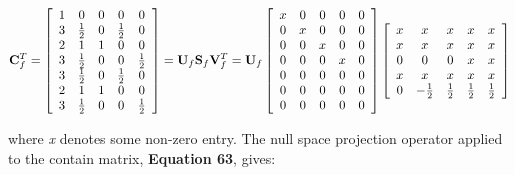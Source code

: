 \documentclass[11pt, titlepage, twoside]{article}
\begin{document}
\begin{MPEquation}[!ht]
\begin{equation}
{\bf{C}}_f^T = \left[ {\begin{array}{*{20}{c}}
1&0&0&0&0\\
3&{\frac{1}{2}}&0&{\frac{1}{2}}&0\\
2&1&1&0&0\\
3&{\frac{1}{2}}&0&0&{\frac{1}{2}}\\
3&{\frac{1}{2}}&0&{\frac{1}{2}}&0\\
2&1&1&0&0\\
3&{\frac{1}{2}}&0&0&{\frac{1}{2}}
\end{array}} \right] = {{\bf{U}}_f}{{\bf{S}}_f}{\bf{V}}_f^T = {{\bf{U}}_f}\left[ {\begin{array}{*{20}{c}}
x&0&0&0&0\\
0&x&0&0&0\\
0&0&x&0&0\\
0&0&0&x&0\\
0&0&0&0&0\\
0&0&0&0&0\\
0&0&0&0&0
\end{array}} \right]\left[ {\begin{array}{*{20}{c}}
x&x&x&x&x\\
x&x&x&x&x\\
0&0&0&x&x\\
x&x&x&x&x\\
0&{ - \frac{1}{2}}&{\frac{1}{2}}&{\frac{1}{2}}&{\frac{1}{2}}
\end{array}} \right]
\end{equation}
\label{MPEquationElement:124E1C3D-DC37-4FB1-AAE5-8CA8DA6D903D}
\end{MPEquation}
where \emph{x} denotes some non-zero entry. The null space projection operator applied to the contain matrix, \textbf{Equation 63}, gives:
\end{document}
